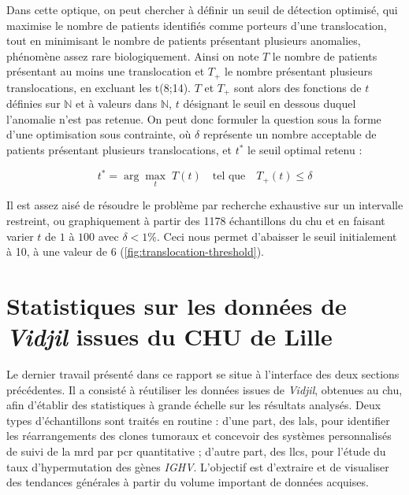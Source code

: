 \vspace{1em}

Dans cette optique, on peut chercher à définir un seuil de détection optimisé, qui maximise le nombre de patients identifiés comme porteurs d'une translocation, 
tout en minimisant le nombre de patients présentant plusieurs anomalies, phénomène assez rare biologiquement. Ainsi on note $T$ le nombre de patients 
présentant au moins une translocation et $T_{+}$ le nombre présentant plusieurs translocations, en excluant les t(8;14). $T$ et $T_{+}$ sont alors des fonctions 
de $t$ définies sur $\mathbb{N}$ et à valeurs dans $\mathbb{N}$, $t$ désignant le seuil en dessous duquel l'anomalie n'est pas retenue. On peut donc formuler la question sous la forme d'une optimisation sous contrainte, 
où $\delta$ représente un nombre acceptable de patients présentant plusieurs translocations, et $t^*$ le seuil optimal retenu :

\begin{equation}
    t^* = \arg\max_{t} \; T(t) \quad \text{tel que} \quad T_{+}(t) \leq \delta
 \end{equation}
    
 Il est assez aisé de résoudre le problème par recherche exhaustive sur un intervalle restreint, ou graphiquement à partir des 1178 échantillons du \gls{chu} et en faisant varier 
 $t$ de $1$ à $100$ avec $\delta < 1 \%$. Ceci nous permet d'abaisser le seuil initialement à 10, à une valeur de 6 (\autoref{fig:translocation-threshold}).



\section{Statistiques sur les données de \textit{Vidjil} issues du CHU de Lille}

Le dernier travail présenté dans ce rapport se situe à l'interface des deux sections précédentes. Il a consisté à réutiliser les données issues de \textit{Vidjil}, obtenues au \gls{chu}, 
afin d'établir des statistiques à grande échelle sur les résultats analysés. Deux types d'échantillons sont traités en routine : d'une part, des \glspl{lal}, pour identifier les 
réarrangements des clones tumoraux et concevoir des systèmes personnalisés de suivi de la \gls{mrd} par \gls{pcr} quantitative ; d'autre part, des \glspl{llc}, pour l'étude du taux 
d'hypermutation des gènes \textit{IGHV}. L'objectif est d'extraire et de visualiser des tendances générales à partir du volume important de données acquises.

